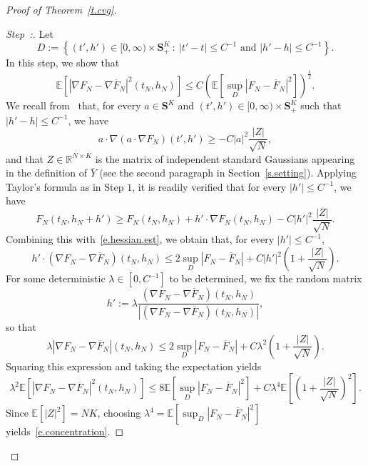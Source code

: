\documentclass[AHL,Unicode,longabstracts,published]{cedram}
\newcommand{\R}{\mathbb{R}}
\newcommand{\E}{\mathbb{E}}
\renewcommand{\S}{\mathbf{S}}
\renewcommand{\le}{\leqslant}
\renewcommand{\ge}{\geqslant}
\renewcommand{\bar}{\overline}
\newcommand{\Ll}{\left}
\newcommand{\Rr}{\right}
\newcounter{stepcount}
\newenvironment{step}{\refstepcounter{stepcount}\begin{proof}[Step~\thestepcount:]}{\let\qed\relax\end{proof}}
\begin{document}
\begin{proof}[Proof of Theorem~\ref{t.cvg}]
\begin{step}\label{proof-the5.1-step2}
Let
\begin{equation*}
D := \Ll\{ \Ll(t',h'\Rr) \in [0,\infty) \times \S^K_+ \ : \ \Ll|t'-t\Rr| \le C^{-1} \text{ and } \Ll|h'-h\Rr| \le C^{-1} \Rr\}.
\end{equation*}
In this step, we show that
\begin{equation}\label{e.concentration}
\E \Ll[\Ll|\nabla F_N - \nabla \bar F_N\Rr|^2\Ll(t_N,h_N\Rr) \Rr] \le C \Ll(\E \Ll[\sup_D \Ll|F_N - \bar F_N\Rr|^2 \Rr]\Rr)^\frac 1 2.
\end{equation}
We recall from~\cite[(3.13)]{HBJ} that, for every $a \in \S^K$ and $(t',h') \in [0,\infty) \times \S^K_+$ such that $|h'-h| \le C^{-1}$, we have
\begin{equation*}
a \cdot \nabla \Ll(a \cdot \nabla F_N\Rr)\Ll(t',h'\Rr) \ge -C |a|^2 \frac{|Z|}{\sqrt{N}},
\end{equation*}
and that $Z\in\R^{N\times K}$ is the matrix of independent standard Gaussians appearing in the definition of $\overline{Y}$ (see the second paragraph in Section~\ref{s.setting}). Applying Taylor's formula as in Step $1$, it is readily verified that for every $|h'| \le C^{-1}$, we have
\begin{equation*}
F_N\Ll(t_N,h_N+ h'\Rr) \ge F_N\Ll(t_N,h_N\Rr) + h' \cdot \nabla F_N\Ll(t_N,h_N\Rr) - C |h'|^2 \frac{|Z|}{\sqrt{N}}.
\end{equation*}
Combining this with~\eqref{e.hessian.est}, we obtain that, for every $|h'| \le C^{-1}$,
\begin{equation*}
h' \cdot \Ll(\nabla F_N - \nabla \bar F_N\Rr)\Ll(t_N,h_N\Rr)\le 2 \sup_D \Ll|F_N - \bar F_N\Rr| + C |h'|^2 \Ll(1+\frac{|Z|}{\sqrt{N}}\Rr).
\end{equation*}
For some deterministic $\lambda \in [0,C^{-1}]$ to be determined, we fix {the random matrix}
\begin{equation*}
h' := \lambda \frac{\Ll(\nabla F_N - \nabla \bar F_N\Rr)\Ll(t_N,h_N\Rr)}{\Ll|\Ll(\nabla F_N - \nabla \bar F_N\Rr)\Ll(t_N,h_N\Rr)\Rr|},
\end{equation*}
so that
\begin{equation*}
\lambda |\nabla F_N - \nabla \bar F_N|(t_N,h_N) \le 2 \sup_D |F_N - \bar F_N| + C \lambda^2 \Ll(1+\frac{|Z|}{\sqrt{N}}\Rr).
\end{equation*}
Squaring this expression and taking the expectation yields
\begin{equation*}
\lambda^2 \E \Ll[|\nabla F_N - \nabla \bar F_N|^2(t_N,h_N) \Rr] \le 8 \E \Ll[\sup_D |F_N - \bar F_N|^2 \Rr] + C \lambda^4 \E \Ll[\Ll(1+\frac{|Z|}{\sqrt{N}}\Rr)^2\Rr].
\end{equation*}
Since $\E[|Z|^2] = NK$, choosing $\lambda^4 = \E \Ll[\sup_D |F_N - \bar F_N|^2 \Rr] $ yields~\eqref{e.concentration}.
\end{step}



\end{proof}
\end{document}
